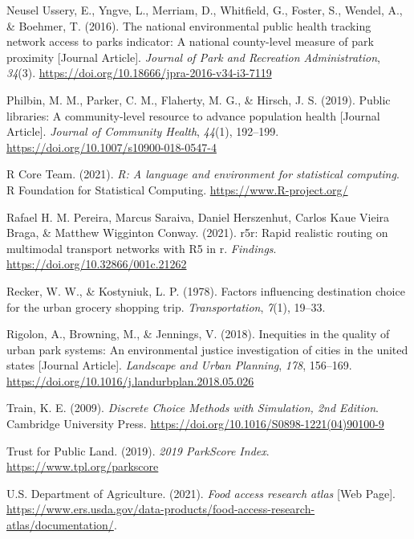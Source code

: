 \documentclass[review, 3p]{elsarticle} %
\newlength{\cslhangindent}
\newlength{\cslentryspacingunit} %
\newenvironment{CSLReferences}[2] %
 {%
  \setlength{\parindent}{0pt}
  \ifodd #1
  \let\oldpar\par
  \def\par{\hangindent=\cslhangindent\oldpar}
  \fi
  \setlength{\parskip}{#2\cslentryspacingunit}
 }%
 {}
\begin{document}
\begin{CSLReferences}{1}{0}
\leavevmode{}%
Neusel Ussery, E., Yngve, L., Merriam, D., Whitfield, G., Foster, S., Wendel, A., \& Boehmer, T. (2016). The national environmental public health tracking network access to parks indicator: A national county-level measure of park proximity {[}Journal Article{]}. \emph{Journal of Park and Recreation Administration}, \emph{34}(3). \url{https://doi.org/10.18666/jpra-2016-v34-i3-7119}

\leavevmode{}%
Philbin, M. M., Parker, C. M., Flaherty, M. G., \& Hirsch, J. S. (2019). Public libraries: A community-level resource to advance population health {[}Journal Article{]}. \emph{Journal of Community Health}, \emph{44}(1), 192--199. \url{https://doi.org/10.1007/s10900-018-0547-4}

\leavevmode{}%
R Core Team. (2021). \emph{R: A language and environment for statistical computing}. R Foundation for Statistical Computing. \url{https://www.R-project.org/}

\leavevmode{}%
Rafael H. M. Pereira, Marcus Saraiva, Daniel Herszenhut, Carlos Kaue Vieira Braga, \& Matthew Wigginton Conway. (2021). r5r: Rapid realistic routing on multimodal transport networks with R5 in r. \emph{Findings}. \url{https://doi.org/10.32866/001c.21262}

\leavevmode{}%
Recker, W. W., \& Kostyniuk, L. P. (1978). Factors influencing destination choice for the urban grocery shopping trip. \emph{Transportation}, \emph{7}(1), 19--33.

\leavevmode{}%
Rigolon, A., Browning, M., \& Jennings, V. (2018). Inequities in the quality of urban park systems: An environmental justice investigation of cities in the united states {[}Journal Article{]}. \emph{Landscape and Urban Planning}, \emph{178}, 156--169. \url{https://doi.org/10.1016/j.landurbplan.2018.05.026}

\leavevmode{}%
Train, K. E. (2009). \emph{{Discrete Choice Methods with Simulation, 2nd Edition}}. Cambridge University Press. \url{https://doi.org/10.1016/S0898-1221(04)90100-9}

\leavevmode{}%
Trust for Public Land. (2019). \emph{{2019 ParkScore Index}}. \url{https://www.tpl.org/parkscore}

\leavevmode{}%
U.S. Department of Agriculture. (2021). \emph{Food access research atlas} {[}Web Page{]}. \url{https://www.ers.usda.gov/data-products/food-access-research-atlas/documentation/}.


\end{CSLReferences}
\end{document}
